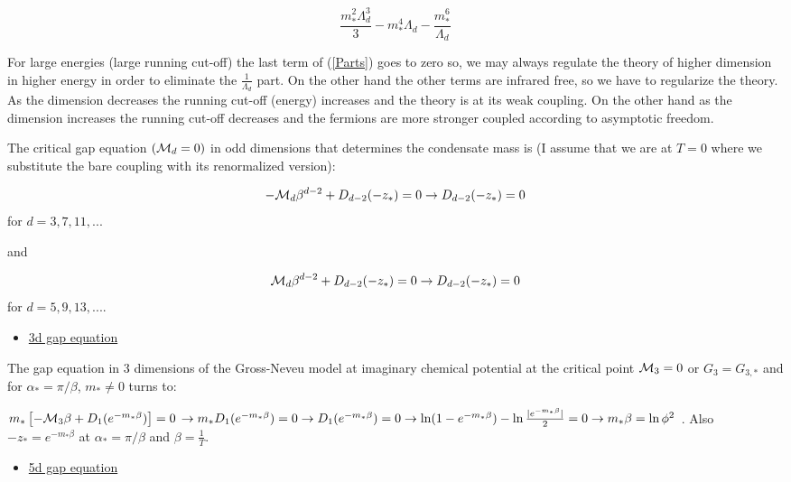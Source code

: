 \documentclass[twoside]{article}
\begin{document}
\begin{equation}
\label{Parts}
\frac{m_*^2\Lambda_d^3}{3}-m_*^4\Lambda_d-\frac{m_*^6}{\Lambda_d}
\end{equation}

For large energies (large running cut-off) the last term of ({\ref{Parts}}) goes to zero so, we may always regulate the theory of higher dimension in higher energy in order to eliminate the $\frac{1}{\Lambda_d}$ part. On the other hand the other terms are infrared free, so we have to regularize the theory. As the dimension decreases the running cut-off (energy) increases and the theory is at its weak coupling. On the other hand as the dimension increases the running cut-off decreases and the fermions are more stronger coupled according to asymptotic freedom.

The critical gap equation $({\cal M}_d=0)$ in odd dimensions that determines the condensate mass is (I assume that we are at $T=0$ where we substitute the bare coupling with its renormalized version):

\begin{equation}
-{\cal M}_d\beta^{d-2}+D_{d-2}(-z_*)=0\rightarrow D_{d-2}(-z_*)=0
\end{equation}
for $d=3,7,11,...$

and 

\begin{equation}
{\cal M}_d\beta^{d-2}+D_{d-2}(-z_*)=0\rightarrow D_{d-2}(-z_*)=0
\end{equation}
for $d=5,9,13,...$. 
 
 \begin{itemize}
 	\item \underline{3d gap equation}
 \end{itemize}
 
 The gap equation in 3 dimensions of the Gross-Neveu model at imaginary chemical potential at the critical point ${\cal M}_3=0$ or $G_3=G_{3,*}$ and for $\alpha_*=\pi/\beta$, $m_*\not=0$ turns to:
 
 $m_*\left[-{\cal M}_3\beta+D_1(e^{-m_*\beta})\right]=0\,\rightarrow m_* D_1(e^{-m_*\beta})=0\rightarrow D_1(e^{-m_*\beta})=0\rightarrow \ln(1-e^{-m_*\beta})-\ln\frac{|e^{-m_*\beta}|}{2}=0\rightarrow m_*\beta=\ln\phi^2$ \cite {Filothodoros:2016txa,Sachdev:1993pr}. Also $-z_*=e^{-m_*\beta}$ at $\alpha_*=\pi/\beta$ and $\beta=\frac{1}{T}$. 
 
 
 \begin{itemize}
 	\item \underline{5d gap equation}
 \end{itemize}
 
\end{document}
